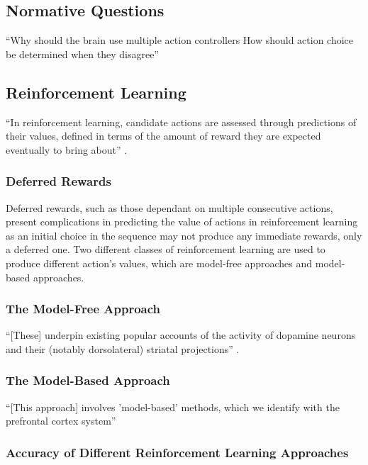 \documentclass[10pt]{article}
\begin{document}
\subsection{Normative Questions}

	``Why should the brain use multiple action controllers
	How should action choice be determined when they disagree'' \parencite{Daw}


\subsection{Reinforcement Learning}

	``In reinforcement learning, candidate actions are assessed through predictions of their values, defined in terms of the amount of reward they are expected eventually to bring about'' \parencite{Daw}.

	\subsubsection{Deferred Rewards}

		Deferred rewards, such as those dependant on multiple consecutive actions, present complications in predicting the value of actions in reinforcement learning as an initial choice in the sequence may not produce any immediate rewards, only a deferred one. Two different classes of reinforcement learning are used to produce different action's values, which are model-free approaches and model-based approaches.

	\subsubsection{The Model-Free Approach}

		``[These] underpin existing popular accounts of the activity of dopamine neurons and their (notably dorsolateral) striatal projections'' \parencite{Daw}.

	\subsubsection{The Model-Based Approach}

		``[This approach] involves 'model-based' methods, which we identify with the prefrontal cortex system'' \parencite{Daw}

	\subsubsection{Accuracy of Different Reinforcement Learning Approaches}
\end{document}
